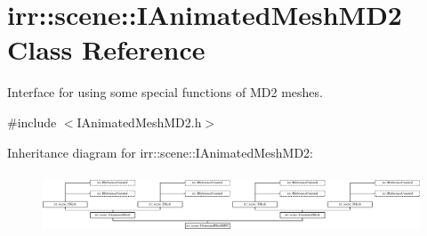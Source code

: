 \hypertarget{classirr_1_1scene_1_1IAnimatedMeshMD2}{}\section{irr\+:\+:scene\+:\+:I\+Animated\+Mesh\+M\+D2 Class Reference}
\label{classirr_1_1scene_1_1IAnimatedMeshMD2}


Interface for using some special functions of M\+D2 meshes.  




{\ttfamily \#include $<$I\+Animated\+Mesh\+M\+D2.\+h$>$}

Inheritance diagram for irr\+:\+:scene\+:\+:I\+Animated\+Mesh\+M\+D2\+:\begin{figure}[H]
\begin{center}
\leavevmode
\includegraphics[height=1.822917cm]{classirr_1_1scene_1_1IAnimatedMeshMD2}
\end{center}
\end{figure}
